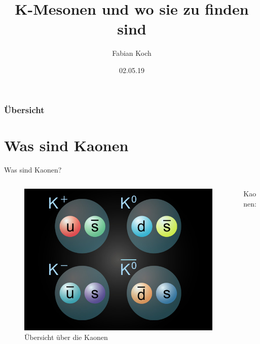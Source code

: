 \documentclass[aspectratio=1610, professionalfonts, 9pt, t]{beamer}
\title{K-Mesonen und wo sie zu finden sind}
\author[F.~Koch]{Fabian Koch}
\date{02.05.19}
\institute[Fakultät Physik ]{Fakultät Physik}
\begin{document}


\maketitle

\begin{frame}
  \frametitle{Übersicht}
  \tableofcontents
\end{frame}


\section{Was sind Kaonen}
  \begin{frame}{Was sind Kaonen?}
    \begin{columns}[onlytextwidth]
      \begin{column}{0.4\textwidth}
        \begin{figure}[ht]
          \begin{center}
            \includegraphics[height=0.6\textheight]{Images/Kaonen.png}
            \caption{Übersicht über die Kaonen}
          \end{center}
        \end{figure}
      \end{column}
      \begin{column}{0.5\textwidth}
        Kaonen:
        \begin{itemize}

\end{itemize}
\end{column}
\end{columns}
\end{frame}
\end{document}
